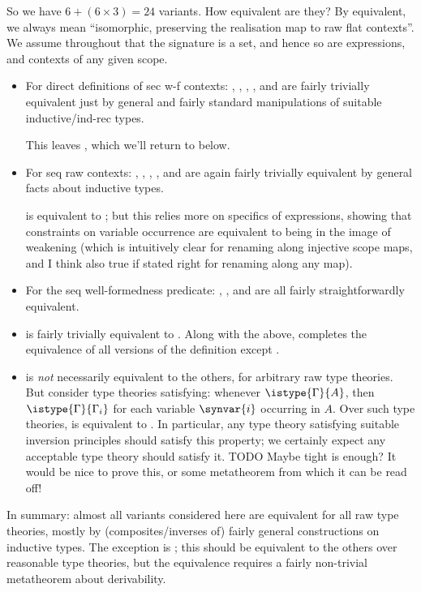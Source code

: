 So we have $6 + (6 \times 3) = 24$ variants. How equivalent are they?  By equivalent, we always mean “isomorphic, preserving the realisation map to raw flat contexts”.  We assume throughout that the signature is a set, and hence so are expressions, and contexts of any given scope.

\begin{itemize}
\item For direct definitions of sec w-f contexts: , , , , and  are fairly trivially equivalent just by general and fairly standard manipulations of suitable inductive/ind-rec types.

  This leaves , which we’ll return to below.
  
\item For seq raw contexts: , , , , and  are again fairly trivially equivalent by general facts about inductive types.

   is equivalent to ; but this relies more on specifics of expressions, showing that constraints on variable occurrence are equivalent to being in the image of weakening (which is intuitively clear for renaming along injective scope maps, and I think also true if stated right for renaming along any map).

\item For the seq well-formedness predicate: , , and  are all fairly straightforwardly equivalent.

\item {} is fairly trivially equivalent to .  Along with the above, completes the equivalence of all versions of the definition except .

\item {} is \emph{not} necessarily equivalent to the others, for arbitrary raw type theories. But consider type theories satisfying: whenever $\istype{\Gamma}{A}$, then $\istype{\Gamma}{\Gamma_i}$ for each variable $\synvar{i}$ occurring in $A$.  Over such type theories,  is equivalent to .  In particular, any type theory satisfying suitable inversion principles should satisfy this property; we certainly expect any acceptable type theory should satisfy it.  TODO Maybe tight is enough?  It would be nice to prove this, or some metatheorem from which it can be read off!
\end{itemize}

In summary: almost all variants considered here are equivalent for all raw type theories, mostly by (composites/inverses of) fairly general constructions on inductive types.  The exception is ; this should be equivalent to the others over reasonable type theories, but the equivalence requires a fairly non-trivial metatheorem about derivability.
